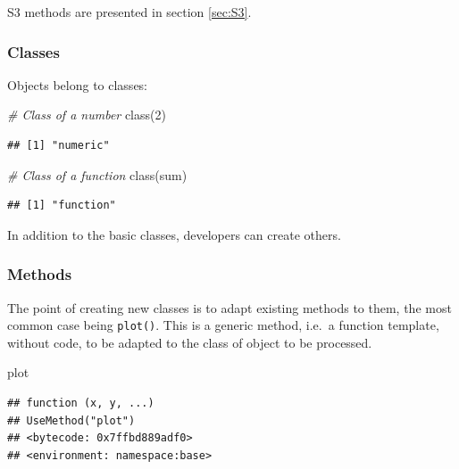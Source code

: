 \documentclass[
  12pt,
  american,
  a4paper,
  extrafontsizes,onecolumn,openright
  ]{memoir}
\newenvironment{Shaded}{\begin{snugshade}}{\end{snugshade}}
\newcommand{\CommentTok}[1]{\textcolor[rgb]{0.56,0.35,0.01}{\textit{#1}}}
\newcommand{\DecValTok}[1]{\textcolor[rgb]{0.00,0.00,0.81}{#1}}
\newcommand{\FunctionTok}[1]{\textcolor[rgb]{0.00,0.00,0.00}{#1}}
\newcommand{\NormalTok}[1]{#1}
\begin{document}
S3 methods are presented in section \ref{sec:S3}.

\hypertarget{classes}{%
\subsubsection{Classes}\label{classes}}

Objects belong to classes:

\scriptsize

\begin{Shaded}
\begin{Highlighting}[]
\CommentTok{\# Class of a number}
\FunctionTok{class}\NormalTok{(}\DecValTok{2}\NormalTok{)}
\end{Highlighting}
\end{Shaded}

\begin{verbatim}
## [1] "numeric"
\end{verbatim}

\begin{Shaded}
\begin{Highlighting}[]
\CommentTok{\# Class of a function}
\FunctionTok{class}\NormalTok{(sum)}
\end{Highlighting}
\end{Shaded}

\begin{verbatim}
## [1] "function"
\end{verbatim}

\normalsize

In addition to the basic classes, developers can create others.

\hypertarget{methods}{%
\subsubsection{Methods}\label{methods}}

The point of creating new classes is to adapt existing methods to them, the most common case being \texttt{plot()}.
This is a generic method, i.e.~a function template, without code, to be adapted to the class of object to be processed.

\scriptsize

\begin{Shaded}
\begin{Highlighting}[]
\NormalTok{plot}
\end{Highlighting}
\end{Shaded}

\begin{verbatim}
## function (x, y, ...) 
## UseMethod("plot")
## <bytecode: 0x7ffbd889adf0>
## <environment: namespace:base>
\end{verbatim}
\end{document}
